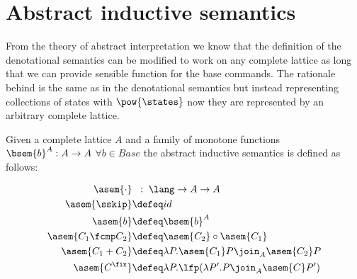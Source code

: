 \section{Abstract inductive semantics}

From the theory of abstract interpretation we know that the definition of the
denotational semantics can be modified to work on any complete lattice as long
that we can provide sensible function for the base commands. The rationale
behind is the same as in the denotational semantics but instead representing
collections of states with $\pow{\states}$ now they are represented by an
arbitrary complete lattice.

\begin{definition}

  \label{def:abstract-inductive-semantics}
  Given a complete lattice $A$ and a family of monotone functions $\bsem{b}^A : A
  \to A$ $\forall b \in Base$ the abstract inductive semantics is defined as 
  follows:

  \begin{align*}
      \asem{\cdot}         & \;\;:\; \lang \to A \to A \\
      \asem{\sskip}         &\defeq id \\
      \asem{b}             &\defeq \bsem{b}^A \\
      \asem{C_1 \fcmp C_2} &\defeq \asem{C_2} \circ \asem{C_1} \\
      \asem{C_1 + C_2}     &\defeq \lambda P . \asem{C_1} P \join_A \asem{C_2} P \\
      \asem{C^\fix}        &\defeq \lambda P . \lfp(\lambda P'. P \join_A \asem{C} P')
  \end{align*}
\end{definition}

